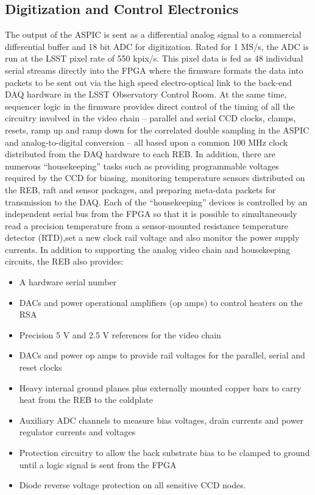 \subsection{Digitization and Control Electronics}
The output of the ASPIC is sent as a differential analog signal to a commercial differential buffer and 18 bit ADC for digitization. Rated for 1 MS/s, the ADC is run at the LSST pixel rate of 550 kpix/s. This pixel data is fed as 48 individual serial streams directly into the FPGA where the firmware formats the data into packets to be sent out via the high speed electro-optical link to the back-end DAQ hardware in the LSST Observatory Control Room. At the same time, sequencer logic in the firmware provides direct control of the timing of all the circuitry involved in the video chain – parallel and serial CCD clocks, clamps, resets, ramp up and ramp down for the correlated double sampling in the ASPIC and analog-to-digital conversion – all based upon a common 100 MHz clock distributed from the DAQ hardware to each REB. In addition, there are numerous “housekeeping” tasks such as providing programmable voltages required by the CCD for biasing, monitoring temperature sensors distributed on the REB, raft and sensor packages, and preparing meta-data packets for transmission to the DAQ. Each of the “housekeeping” devices is controlled by an independent serial bus from the FPGA so that it is possible to simultaneously read a precision temperature from a sensor-mounted resistance temperature detector (RTD),set a new clock rail voltage and also monitor the power supply currents.
In addition to supporting the analog video chain and housekeeping circuits, the REB also provides:
\begin{itemize}
\item{} A hardware serial number
\item{} DACs and power operational amplifiers (op amps) to control heaters on the RSA
\item{} Precision 5 V and 2.5 V references for the video chain
\item{} DACs and power op amps to provide rail voltages for the parallel, serial and reset clocks
\item{} Heavy internal ground planes plus externally mounted copper bars to carry heat from the REB to the coldplate
\item{} Auxiliary ADC channels to measure bias voltages, drain currents and power regulator currents and voltages
\item{} Protection circuitry to allow the back substrate bias to be clamped to ground until a logic signal is sent from the FPGA
\item{} Diode reverse voltage protection on all sensitive CCD nodes.
\end{itemize}

